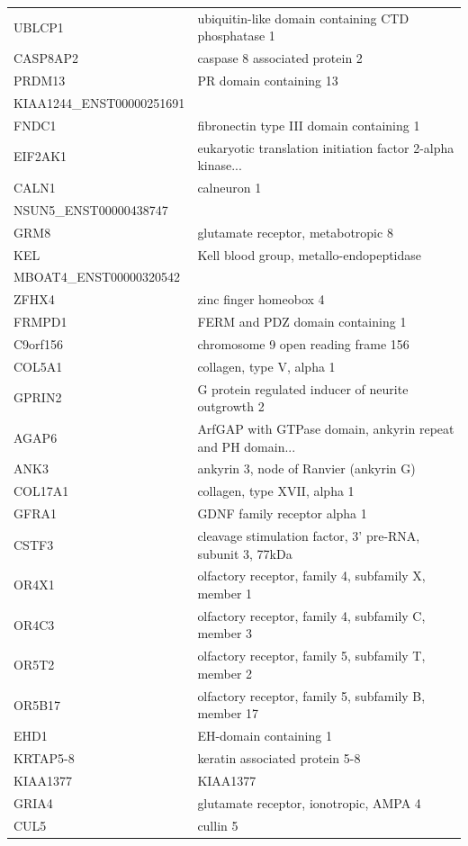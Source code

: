 \documentclass[10pt]{article}
\begin{document}
\begin{table}[ht]
\begin{tabular}{l l}
UBLCP1 & ubiquitin-like domain containing CTD phosphatase 1 \\
CASP8AP2 & caspase 8 associated protein 2 \\
PRDM13 & PR domain containing 13 \\
KIAA1244\_ENST00000251691 &  \\
FNDC1 & fibronectin type III domain containing 1 \\
EIF2AK1 & eukaryotic translation initiation factor 2-alpha kinase... \\
CALN1 & calneuron 1 \\
NSUN5\_ENST00000438747 &  \\
GRM8 & glutamate receptor, metabotropic 8 \\
KEL & Kell blood group, metallo-endopeptidase \\
MBOAT4\_ENST00000320542 &  \\
ZFHX4 & zinc finger homeobox 4 \\
FRMPD1 & FERM and PDZ domain containing 1 \\
C9orf156 & chromosome 9 open reading frame 156 \\
COL5A1 & collagen, type V, alpha 1 \\
GPRIN2 & G protein regulated inducer of neurite outgrowth 2 \\
AGAP6 & ArfGAP with GTPase domain, ankyrin repeat and PH domain... \\
ANK3 & ankyrin 3, node of Ranvier (ankyrin G) \\
COL17A1 & collagen, type XVII, alpha 1 \\
GFRA1 & GDNF family receptor alpha 1 \\
CSTF3 & cleavage stimulation factor, 3' pre-RNA, subunit 3, 77kDa \\
OR4X1 & olfactory receptor, family 4, subfamily X, member 1 \\
OR4C3 & olfactory receptor, family 4, subfamily C, member 3 \\
OR5T2 & olfactory receptor, family 5, subfamily T, member 2 \\
OR5B17 & olfactory receptor, family 5, subfamily B, member 17 \\
EHD1 & EH-domain containing 1 \\
KRTAP5-8 & keratin associated protein 5-8 \\
KIAA1377 & KIAA1377 \\
GRIA4 & glutamate receptor, ionotropic, AMPA 4 \\
CUL5 & cullin 5 \\

\end{tabular}
\end{table}
\end{document}
